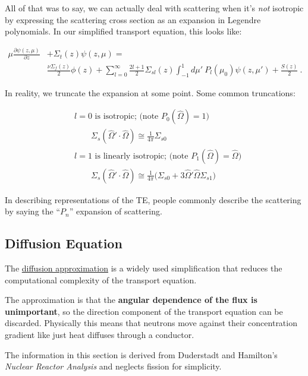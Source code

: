 \documentclass[12pt]{article}
\newcommand{\vOmega}{\ensuremath{\hat{\Omega}}}
\begin{document}
All of that was to say, we can actually deal with scattering when it's
\textit{not} isotropic by expressing the scattering cross section as an
expansion in Legendre polynomials. In our simplified transport equation, this
looks like:

\begin{align*}
\mu \frac{\partial \psi(z, \mu)}{\partial z} &+ \Sigma_t(z)\psi(z, \mu) = \\
&\frac{\nu\Sigma_f(z) }{2}\phi(z) +
\sum_{l=0}^{\infty} \frac{2l+1}{2} \Sigma_{sl}(z) \int_{-1}^1 d\mu'\:
P_l(\mu_0) \psi(z, \mu')  + \frac{S(z)}{2} \:.
\end{align*}

In reality, we truncate the expansion at some point. Some common truncations:

\begin{align*}
&l=0 \text{ is isotropic; (note } P_0 (\vOmega) = 1 \text{)}\\
&\qquad \Sigma_s(\vOmega' \cdot \vOmega) \cong \frac{1}{4\pi}\Sigma_{s0} \\
%
&l=1 \text{ is linearly isotropic; (note } P_1 (\vOmega) = \vOmega \text{)}\\
&\qquad \Sigma_s(\vOmega' \cdot \vOmega) \cong
\frac{1}{4\pi}\bigl( \Sigma_{s0} + 3\vOmega' \vOmega \Sigma_{s1} \bigr) 
\end{align*}

In describing representations of the TE, people commonly describe the
scattering by saying the ``$P_n$'' expansion of scattering. 

\subsection*{Diffusion Equation}

The \underline{diffusion approximation} is a widely used simplification that
reduces the computational complexity of the transport equation. 

The approximation is that the \textbf{angular dependence of the flux is unimportant},
so the direction component of the transport equation can be discarded.
Physically this means that neutrons move against their concentration gradient
like just heat diffuses through a conductor. 

The information in this section is derived from Duderstadt and Hamilton's
\emph{Nuclear Reactor Analysis} and neglects fission for simplicity. 
\end{document}
